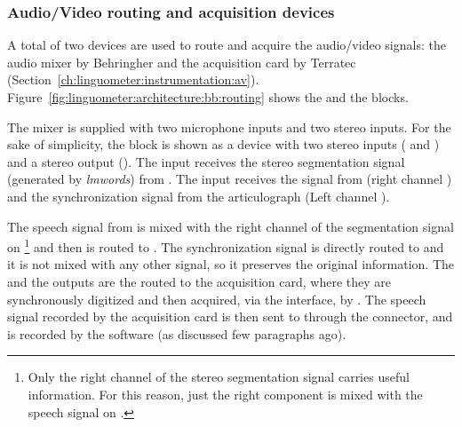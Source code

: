 \subsubsection{Audio/Video routing and acquisition devices}

A total of two devices are used to route and acquire the audio/video signals:
the  audio mixer by Behringher and the  acquisition card by
Terratec (Section~\ref{ch:linguometer:instrumentation:av}).
Figure~\ref{fig:linguometer:architecture:bb:routing} shows the  and the
 blocks.

The  mixer is supplied with two microphone inputs and two stereo
inputs.
For the sake of simplicity,  the  block is shown as a device with 
two stereo inputs ( and ) and a stereo output
().
The  input receives the stereo segmentation signal (generated by 
\emph{lmwords}) from .
The  input receives the  signal from  (right
channel ) and the synchronization signal  from 
the  articulograph (Left channel ).

The speech signal from  is mixed with the right channel of
the segmentation signal on \footnote{Only the right channel of
the stereo segmentation signal carries useful information. For this reason,
just the right component is mixed with the speech signal on .} 
and then is routed to . 
The synchronization signal  is directly routed to 
and it is not mixed with any other signal, so it preserves the original
information.
The  and the  outputs are the routed to the
 acquisition card, where they are synchronously digitized and then
acquired, via the  interface, by .
The speech signal recorded by the acquisition card is then sent to 
through the  connector, and is recorded by the 
software (as discussed few paragraphs ago).
